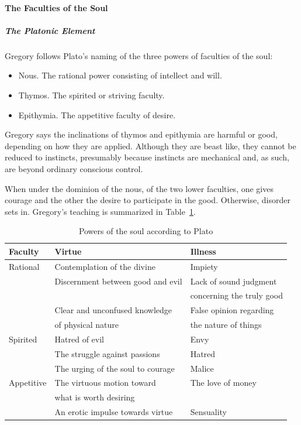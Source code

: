 \paragraph{The Faculties of the Soul}
\subparagraph{The Platonic Element}
Gregory follows Plato's naming of the three powers of faculties of the soul:

\begin{itemize}
\item Nous. The rational power consisting of intellect and will. 
\item Thymos. The spirited or striving faculty. 
\item Epithymia. The appetitive faculty of desire. 
\end{itemize}
Gregory says the inclinations of thymos and epithymia are harmful or good, depending on how they are applied. Although they are beast like, they cannot be reduced to instincts, presumably because instincts are mechanical and, as such, are beyond ordinary conscious control.

When under the dominion of the nous, of the two lower faculties, one gives courage and the other the desire to participate in the good. Otherwise, disorder sets in. Gregory's teaching is summarized in Table~\ref{tab:On the Human Soul}.

\begin{table}[h]\small
\begin{tabular}{lll}\toprule
\textbf{Faculty} &
\textbf{Virtue} &
\textbf{Illness}\\\midrule
Rational & Contemplation of the divine & Impiety\\
& Discernment between good and evil& Lack of sound judgment \\
&&concerning the truly good\\
&Clear and unconfused knowledge  & False opinion regarding \\
&of physical nature&the nature of things\\\midrule
Spirited & Hatred of evil &Envy\\ 
& The struggle against passions & Hatred \\
& The urging of the soul to courage & Malice \\\midrule
Appetitive & The virtuous motion toward & The love of money \\
&what is worth desiring&\\
& An erotic impulse towards virtue & Sensuality
\\\bottomrule
\end{tabular}
\caption{Powers of the soul according to Plato}
\label{tab:On the Human Soul}
\end{table}

